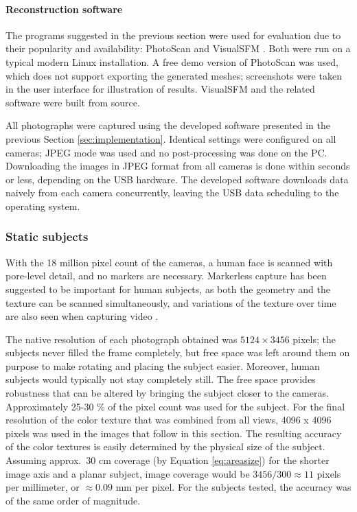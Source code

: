 \paragraph{Reconstruction software}
The programs suggested in the previous section were used for evaluation due to their popularity and availability: PhotoScan \cite{photoscan} and VisualSFM \cite{wu2013towards}.
Both were run on a typical modern Linux installation.
A free demo version of PhotoScan was used, which does not support exporting the generated meshes; screenshots were taken in the user interface for illustration of results.
VisualSFM and the related software were built from source.

All photographs were captured using the developed software presented in the previous Section \ref{sec:implementation}.
Identical settings were configured on all cameras; JPEG mode was used and no post-processing was done on the PC.
Downloading the images in JPEG format from all cameras is done within seconds or less, depending on the USB hardware.
The developed software downloads data naively from each camera concurrently, leaving the USB data scheduling to the operating system.
\subsubsection{Static subjects}

With the 18 million pixel count of the cameras, a human face is scanned with pore-level detail, and no markers are necessary.
Markerless capture has been suggested to be important for human subjects, as both the geometry and the texture can be scanned simultaneously, and variations of the texture over time are also seen when capturing video \cite{bradley2010high}.

The native resolution of each photograph obtained was $5124 \times 3456$ pixels; the subjects never filled the frame completely, but free space was left around them on purpose to make rotating and placing the subject easier.
Moreover, human subjects would typically not stay completely still.
The free space provides robustness that can be altered by bringing the subject closer to the cameras.
Approximately 25-30 \% of the pixel count was used for the subject.
For the final resolution of the color texture that was combined from all views, 4096 x 4096 pixels was used in the images that follow in this section.
The resulting accuracy of the color textures is easily determined by the physical size of the subject.
Assuming approx.\ 30 cm coverage (by Equation \ref{eq:areasize}) for the shorter image axis and a planar subject, image coverage would be $3456 / 300 \approx 11$ pixels per millimeter, or $\approx 0.09$ mm per pixel.
For the subjects tested, the accuracy was of the same order of magnitude.

